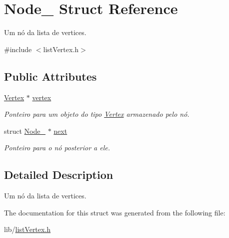 \hypertarget{struct_node__}{\section{Node\-\_\- Struct Reference}
\label{struct_node__}
}


Um nó da lista de vertices.  




{\ttfamily \#include $<$list\-Vertex.\-h$>$}

\subsection*{Public Attributes}
\begin{DoxyCompactItemize}
\item 
\hypertarget{struct_node___ac1e605a990691c254e25ec7eeebc6dcc}{\hyperlink{class_vertex}{Vertex} $\ast$ \hyperlink{struct_node___ac1e605a990691c254e25ec7eeebc6dcc}{vertex}}\label{struct_node___ac1e605a990691c254e25ec7eeebc6dcc}

\begin{DoxyCompactList}\small\item\em Ponteiro para um objeto do tipo \hyperlink{class_vertex}{Vertex} armazenado pelo nó. \end{DoxyCompactList}\item 
\hypertarget{struct_node___ac9ece2193b853882151ad6fc9b29b152}{struct \hyperlink{struct_node__}{Node\-\_\-} $\ast$ \hyperlink{struct_node___ac9ece2193b853882151ad6fc9b29b152}{next}}\label{struct_node___ac9ece2193b853882151ad6fc9b29b152}

\begin{DoxyCompactList}\small\item\em Ponteiro para o nó posterior a ele. \end{DoxyCompactList}\end{DoxyCompactItemize}


\subsection{Detailed Description}
Um nó da lista de vertices. 

The documentation for this struct was generated from the following file\-:\begin{DoxyCompactItemize}
\item 
lib/\hyperlink{list_vertex_8h}{list\-Vertex.\-h}\end{DoxyCompactItemize}
